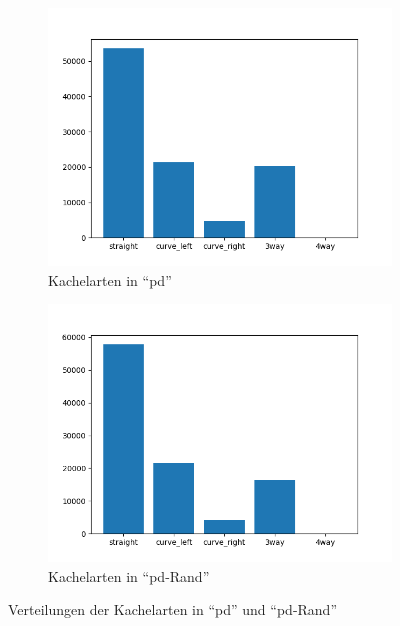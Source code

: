 \begin{figure}[H]
	\centering
	\begin{subfigure}[h]{0.5\textwidth}
		\centering
		\includegraphics[width=\linewidth]{kapitel4/images/plots/tiles-pd.png}
		\caption{Kachelarten in ``\acs{pd}''}
		\label{pd-drive-tiles}
	\end{subfigure}%
	\begin{subfigure}[h]{0.5\textwidth}
		\centering
		\includegraphics[width=\linewidth]{kapitel4/images/plots/tiles-pd-rand.png}
		\caption{Kachelarten in ``\acs{pd}-Rand''}
		\label{pd-rand-tiles}
	\end{subfigure}
	\caption{Verteilungen der Kachelarten in ``\acs{pd}'' und ``\acs{pd}-Rand''}
	\label{pd-tiles}
\end{figure}

